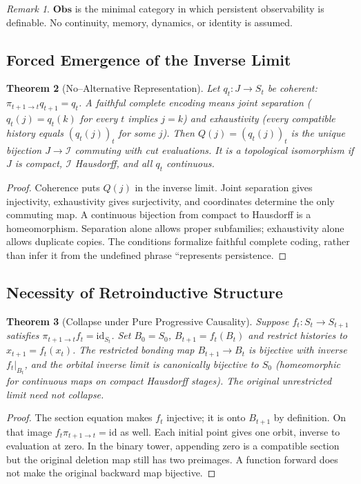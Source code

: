 \documentclass[11pt,a4paper]{article}
\theoremstyle{plain}
\newtheorem{theorem}{Theorem}[section]
\theoremstyle{definition}
\theoremstyle{remark}
\newtheorem{remark}[theorem]{Remark}
\begin{document}
\begin{remark}
$\mathbf{Obs}$ is the minimal category in which persistent observability is definable. No continuity, memory, dynamics, or identity is assumed.
\end{remark}

\subsection{Forced Emergence of the Inverse Limit}

\begin{theorem}[No--Alternative Representation]\label{thm:noalt}
Let $q_t:J\to S_t$ be coherent: $\pi_{t+1\to t}q_{t+1}=q_t$. A faithful complete encoding means joint separation ($q_t(j)=q_t(k)$ for every $t$ implies $j=k$) and exhaustivity (every compatible history equals $(q_t(j))_t$ for some $j$). Then $Q(j)=(q_t(j))_t$ is the unique bijection $J\to\mathcal I$ commuting with cut evaluations. It is a topological isomorphism if $J$ is compact, $\mathcal I$ Hausdorff, and all $q_t$ continuous.
\end{theorem}
\begin{proof}
Coherence puts $Q(j)$ in the inverse limit. Joint separation gives injectivity, exhaustivity gives surjectivity, and coordinates determine the only commuting map. A continuous bijection from compact to Hausdorff is a homeomorphism. Separation alone allows proper subfamilies; exhaustivity alone allows duplicate copies. The conditions formalize faithful complete coding, rather than infer it from the undefined phrase ``represents persistence.
\end{proof}

\subsection{Necessity of Retroinductive Structure}

\begin{theorem}[Collapse under Pure Progressive Causality]\label{thm:collapse}
Suppose $f_t:S_t\to S_{t+1}$ satisfies $\pi_{t+1\to t}f_t=\mathrm{id}_{S_t}$. Set $B_0=S_0$, $B_{t+1}=f_t(B_t)$ and restrict histories to $x_{t+1}=f_t(x_t)$. The restricted bonding map $B_{t+1}\to B_t$ is bijective with inverse $f_t|_{B_t}$, and the orbital inverse limit is canonically bijective to $S_0$ (homeomorphic for continuous maps on compact Hausdorff stages). The original unrestricted limit need not collapse.
\end{theorem}
\begin{proof}
The section equation makes $f_t$ injective; it is onto $B_{t+1}$ by definition. On that image $f_t\pi_{t+1\to t}=\mathrm{id}$ as well. Each initial point gives one orbit, inverse to evaluation at zero. In the binary tower, appending zero is a compatible section but the original deletion map still has two preimages. A function forward does not make the original backward map bijective.
\end{proof}
\end{document}
